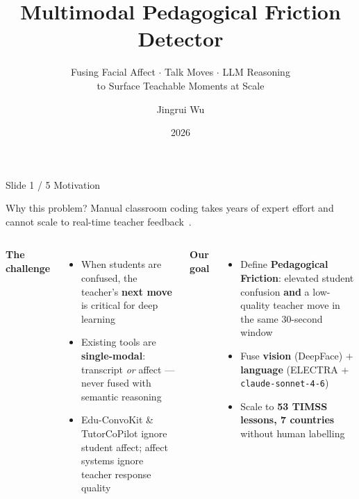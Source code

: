 \documentclass[aspectratio=169,10pt]{beamer}
\title[Pedagogical Friction Detector]{Multimodal Pedagogical Friction Detector}
\subtitle{Fusing Facial Affect $\cdot$ Talk Moves $\cdot$ LLM Reasoning\\
          to Surface Teachable Moments at Scale}
\author{Jingrui Wu}
\institute{Rice University $\cdot$ COMP 646}
\date{2026}
\newcommand{\hl}[1]{\textcolor{myteal}{\textbf{#1}}}
\begin{document}
\begin{frame}[plain]
  \titlepage
\end{frame}

\begin{frame}{Slide 1 / 5 \quad Motivation}
\begin{alertblock}{Why this problem?}
Manual classroom coding takes years of expert effort and cannot scale to
real-time teacher feedback~\cite{timss1999video}.
\end{alertblock}
\medskip
\begin{columns}[T]
\textbf{\textcolor{myteal}{The challenge}}
\begin{itemize}
  \item When students are confused, the teacher's \textbf{next move} is
        critical for deep learning \cite{dmello2012}
  \item Existing tools are \textbf{single-modal}: transcript \emph{or}
        affect --- never fused with semantic reasoning
  \item Edu-ConvoKit \& TutorCoPilot ignore student affect;
        affect systems ignore teacher response quality
\end{itemize}
\textbf{\textcolor{myteal}{Our goal}}
\begin{itemize}
  \item Define \hl{Pedagogical Friction}: elevated student confusion
        \textbf{and} a low-quality teacher move in the same 30-second window
  \item Fuse \textbf{vision} (DeepFace) $+$ \textbf{language}
        (ELECTRA $+$ \texttt{claude-sonnet-4-6})
  \item Scale to \hl{53 TIMSS lessons, 7 countries} without human labelling
\end{itemize}
\end{columns}
\end{frame}
\end{document}
